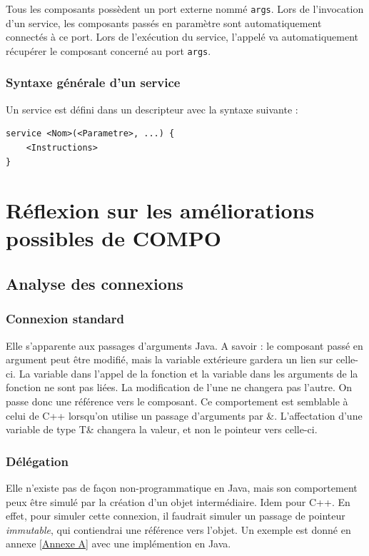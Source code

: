 \documentclass[11pt,a4paper,openany,oneside]{book}
\begin{document}
Tous les composants possèdent un port externe nommé \texttt{args}. Lors de l'invocation d'un service, les composants passés en paramètre sont automatiquement connectés à ce port. Lors de l'exécution du service, l'appelé va automatiquement récupérer le composant concerné au port \texttt{args}.

\subsection{Syntaxe générale d'un service}

Un service est défini dans un descripteur avec la syntaxe suivante : 
\begin{lstlisting}[language=Compo, frame=single, caption=Syntaxe de la définition d'un service]
service <Nom>(<Parametre>, ...) {
    <Instructions>
}
\end{lstlisting}

\chapter{Réflexion sur les améliorations possibles de COMPO}


\section{Analyse des connexions}

\subsection{Connexion standard}

Elle s'apparente aux passages d'arguments Java. A savoir : le composant passé en argument peut être modifié, mais la variable extérieure gardera un lien sur celle-ci. La variable dans l'appel de la fonction et la variable dans les arguments de la fonction ne sont pas liées. La modification de l'une ne changera pas l'autre. On passe donc une référence vers le composant. Ce comportement est semblable à celui de C++ lorsqu'on utilise un passage d'arguments par \&. L'affectation d'une variable de type T\& changera la valeur, et non le pointeur vers celle-ci.

\subsection{Délégation}
    		
Elle n'existe pas de façon non-programmatique en Java, mais son comportement peux être simulé par la création d'un objet intermédiaire. Idem pour C++. En effet, pour simuler cette connexion, il faudrait simuler un passage de pointeur \textit{immutable}, qui contiendrai une référence vers l'objet. Un exemple est donné en annexe \ref{Annexe A} avec une implémention en Java.
\end{document}
